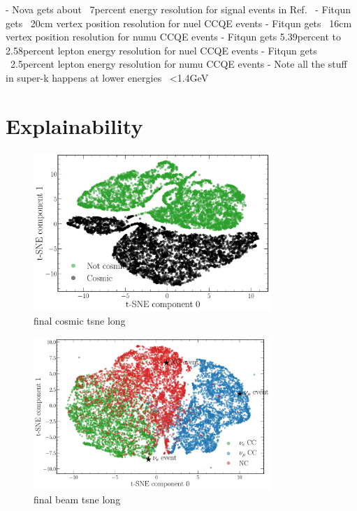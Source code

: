 - Nova gets about ~7percent energy resolution for signal events
in Ref.~\cite{jiang2019}
- Fitqun gets ~20cm vertex position resolution for nuel CCQE events
- Fitqun gets ~16cm vertex position resolution for numu CCQE events
- Fitqun gets 5.39percent to 2.58percent lepton energy resolution for nuel CCQE events
- Fitqun gets ~2.5percent lepton energy resolution for numu CCQE events
- Note all the stuff in super-k happens at lower energies ~<1.4GeV

\section{Explainability} %
\label{sec:cvn_explain} %

\begin{figure} %
    \includegraphics[width=0.8\textwidth]{diagrams/6-cvn/chipsnet/final_cosmic_tsne.pdf}
    \caption[final cosmic tsne short]
    {final cosmic tsne long}
    \label{fig:final_cosmic_tsne}
\end{figure}

\begin{figure} %
    \includegraphics[width=0.8\textwidth]{diagrams/6-cvn/chipsnet/final_beam_tsne.pdf}
    \caption[final beam tsne short]
    {final beam tsne long}
    \label{fig:final_beam_tsne}
\end{figure}

